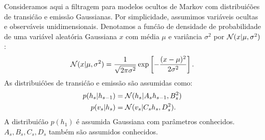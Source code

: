 

\label{ex:kalman-alt}

Consideramos aqui a filtragem para modelos ocultos de Markov com distribui\'c\~oes
de transi\'c\~ao e emiss\~ao Gaussianas. Por simplicidade, assumimos
vari\'aveis ocultas e observ\'aveis unidimensionais. Denotamos a
fun\'c\~ao de densidade de probabilidade de uma vari\'avel aleat\'oria Gaussiana $x$ com
m\'edia $\mu$ e vari\^ancia $\sigma^2$ por $\mathcal{N}(x | \mu, \sigma^2)$:
\begin{equation}
    \mathcal{N}(x | \mu, \sigma^2) = \frac{1}{\sqrt{2 \pi \sigma^2}} \exp\left[ -\frac{(x-\mu)^2}{2\sigma^2} \right].
\end{equation}
As distribui\'c\~oes de transi\'c\~ao e emiss\~ao s\~ao assumidas como:
\begin{align}
    p(h_s | h_{s-1}) &= \mathcal{N}(h_s | A_s h_{s-1}, B^2_s) \label{eq:transition-alt}\\
    p(v_s | h_s) & = \mathcal{N}(v_s | C_s h_s, D^2_s). \label{eq:emission-alt}
\end{align}
A distribui\'c\~ao $p(h_1)$ \'e assumida Gaussiana com par\^ametros conhecidos.
$A_s, B_s, C_s, D_s$ tamb\'em s\~ao assumidos conhecidos.


